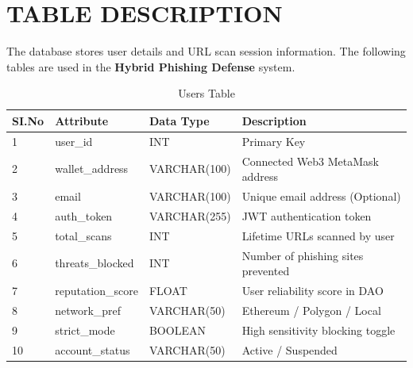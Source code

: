 \section{TABLE DESCRIPTION}

The database stores user details and URL scan session information. The following tables are used in the \textbf{Hybrid Phishing Defense} system.

\begin{table}[h]
\centering
\renewcommand{\arraystretch}{1.5}
\begin{tabular}{|p{}|p{}|p{}|p{}|}
\hline
\textbf{SI.No} & \textbf{Attribute} & \textbf{Data Type} & \textbf{Description} \\
\hline
1 & user\_id & INT & Primary Key \\
\hline
2 & wallet\_address & VARCHAR(100) & Connected Web3 MetaMask address \\
\hline
3 & email & VARCHAR(100) & Unique email address (Optional) \\
\hline
4 & auth\_token & VARCHAR(255) & JWT authentication token \\
\hline
5 & total\_scans & INT & Lifetime URLs scanned by user \\
\hline
6 & threats\_blocked & INT & Number of phishing sites prevented \\
\hline
7 & reputation\_score & FLOAT & User reliability score in DAO \\
\hline
8 & network\_pref & VARCHAR(50) & Ethereum / Polygon / Local \\
\hline
9 & strict\_mode & BOOLEAN & High sensitivity blocking toggle \\
\hline
10 & account\_status & VARCHAR(50) & Active / Suspended \\
\hline
\end{tabular}
\captionsetup{justification=centering}
\caption{Users Table}
\end{table}

